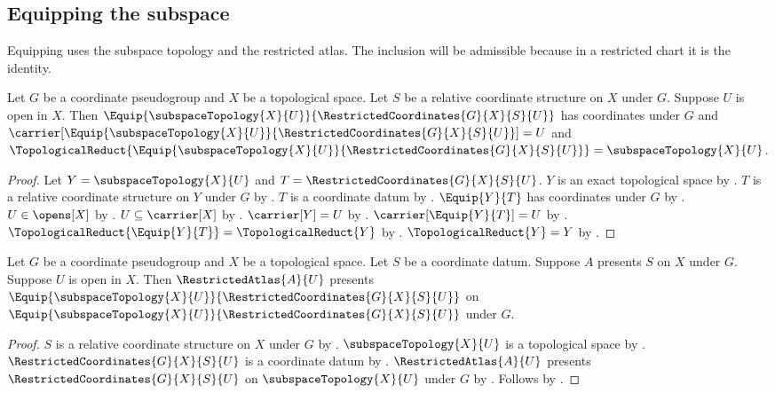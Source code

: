 \subsection{Equipping the subspace}

Equipping uses the subspace topology and the restricted atlas. The inclusion
will be admissible because in a restricted chart it is the identity.

\begin{theorem}\label{equipped_restricted_coordinates}
    Let $G$ be a coordinate pseudogroup and $X$ be a topological space.
    Let $S$ be a relative coordinate structure on $X$ under $G$.
    Suppose $U$ is open in $X$.
    Then $\Equip{\subspaceTopology{X}{U}}{\RestrictedCoordinates{G}{X}{S}{U}}$ has coordinates under $G$
        and $\carrier[\Equip{\subspaceTopology{X}{U}}{\RestrictedCoordinates{G}{X}{S}{U}}]=U$
        and $\TopologicalReduct{\Equip{\subspaceTopology{X}{U}}{\RestrictedCoordinates{G}{X}{S}{U}}}
            =\subspaceTopology{X}{U}$.
\end{theorem}
\begin{proof}
    Let $Y=\subspaceTopology{X}{U}$ and $T=\RestrictedCoordinates{G}{X}{S}{U}$.
    $Y$ is an exact topological space by .
    $T$ is a relative coordinate structure on $Y$ under $G$ by .
    $T$ is a coordinate datum by .
    $\Equip{Y}{T}$ has coordinates under $G$ by .
    $U\in\opens[X]$ by .
    $U\subseteq\carrier[X]$ by .
    $\carrier[Y]=U$ by .
    $\carrier[\Equip{Y}{T}]=U$ by .
    $\TopologicalReduct{\Equip{Y}{T}}=\TopologicalReduct{Y}$ by .
    $\TopologicalReduct{Y}=Y$ by .
\end{proof}

\begin{theorem}\label{equipped_restricted_coordinates_presentation}
    Let $G$ be a coordinate pseudogroup and $X$ be a topological space.
    Let $S$ be a coordinate datum.
    Suppose $A$ presents $S$ on $X$ under $G$.
    Suppose $U$ is open in $X$.
    Then $\RestrictedAtlas{A}{U}$ presents
        $\Equip{\subspaceTopology{X}{U}}{\RestrictedCoordinates{G}{X}{S}{U}}$ on
        $\Equip{\subspaceTopology{X}{U}}{\RestrictedCoordinates{G}{X}{S}{U}}$ under $G$.
\end{theorem}
\begin{proof}
    $S$ is a relative coordinate structure on $X$ under $G$ by .
    $\subspaceTopology{X}{U}$ is a topological space by .
    $\RestrictedCoordinates{G}{X}{S}{U}$ is a coordinate datum by
        .
    $\RestrictedAtlas{A}{U}$ presents $\RestrictedCoordinates{G}{X}{S}{U}$
        on $\subspaceTopology{X}{U}$ under $G$ by .
    Follows by .
\end{proof}

